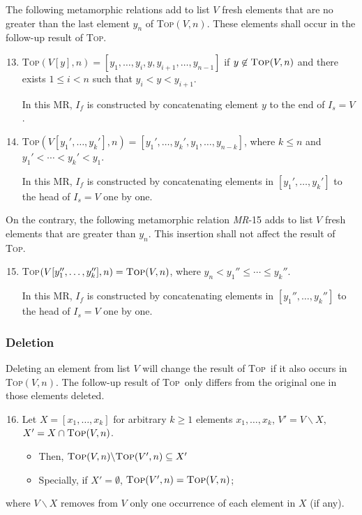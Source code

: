 \documentclass[conference]{IEEEtran}
\theoremstyle{remark}
\newcommand{\Fn}{\textsc{Top}}
\newcommand{\MR}{\textit{MR}}
\begin{document}
The following metamorphic relations add to list $V$ fresh elements that are no greater than the last element $y_n$ of \Fn$(V,n)$. These elements shall occur in the follow-up result of \Fn.
\begin{enumerate}[\MR-1]
\setcounter{enumi}{12}
\item \Fn$(V[y],n)=[y_1,\ldots,y_i,y,y_{i+1},\ldots,y_{n-1}]$ if $y\not\in\Fn(V,n)$ and there exists $1\leq i< n$ such that $y_i<y<y_{i+1}$.

In this MR, $I_f$ is constructed by concatenating element $y$ to the end of $I_s = V$. 

\item \Fn$(V[y_1',\ldots,y_k'],n)=[y_1',\ldots,y_k',y_1,\ldots,y_{n-k}]$, where $k\leq n$ and $y_1'<\cdots< y_k'<y_1$.

In this MR, $I_f$ is constructed by concatenating elements in $[y_1', \ldots, y_k']$ to the head of $I_s = V$ one by one.
\end{enumerate}

On the contrary, the following metamorphic relation \MR-15 adds to list $V$ fresh elements that are greater than $y_n$. This insertion shall not affect the result of \Fn.
\begin{enumerate}[\MR-1]
\setcounter{enumi}{14}
\item \Fn$(V[y_1'',\ldots,y_k''],n)=\Fn(V,n)$, where $y_n<y_1''\leq\cdots\leq y_k''$.

In this MR, $I_f$ is constructed by concatenating elements in $[y_1'', \ldots, y_k'']$ to the head of $I_s = V$ one by one.
\end{enumerate}

\subsubsection{Deletion}
Deleting an element from list $V$ will change the result of \Fn~if it also occurs in \Fn$(V,n)$. The follow-up result of \Fn~only differs from the original one in those elements deleted.
\begin{enumerate}[\MR-1]
\setcounter{enumi}{15}
\item\label{mr-del}Let $X=[x_1,\ldots,x_k]$ for arbitrary $k\geq 1$  elements $x_1,\ldots,x_k$, $V'=V\backslash X$, $X'=X\cap\Fn(V,n)$.
\begin{itemize}
\item Then, $\Fn(V,n)\backslash\Fn(V',n)\subseteq X'$
\item Specially, if $X'=\emptyset$, $\Fn(V',n)=\Fn(V,n)$;
\end{itemize} 
\end{enumerate}
where $V\backslash X$  removes from $V$ only one occurrence of each element in $X$ (if any).
\end{document}
